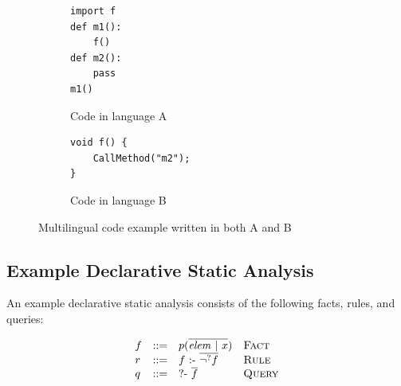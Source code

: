 \begin{figure}[t]
  \centering
  \begin{subfigure}[t]{0.47\textwidth}
    \begin{lstlisting}[style=mpython]
import f
def m1():
    f()
def m2():
    pass
m1()
    \end{lstlisting}
    \vspace*{-.5em}
    \caption{Code in language A}
    \label{fig:exam:langA}
  \end{subfigure}
  \begin{subfigure}[t]{0.47\textwidth}
    \begin{lstlisting}[style=mcpp,firstnumber=7]
void f() {
    CallMethod("m2");
}
    \end{lstlisting}
    \vspace*{2.5em}
    \caption{Code in language B}
    \label{fig:exam:langB}
  \end{subfigure}
  \vspace*{-.5em}
  \caption{Multilingual code example written in both A and B}
  \label{fig:exam}
\end{figure}

%

\subsection{Example Declarative Static Analysis}
An example declarative static analysis consists of the following facts, rules, and queries:

\[
  \begin{array}{llll}
    f & ::= & p(\overline{\mbox{\textit{elem}}\ |\ x}) & \text{\sc Fact}\\
    r & ::= & f\ \mbox{:-}\ \overline{\neg^? f} & \text{\sc Rule}\\
    q & ::= & \mbox{?-}\ \overline{f}\ &  \text{\sc Query}
\end{array}
\]

